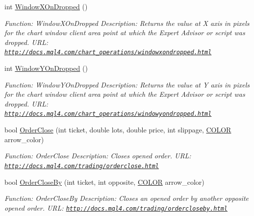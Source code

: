 \begin{DoxyCompactItemize}
int \hyperlink{class_m_q_l4_c_sharp_1_1_base_1_1_m_q_l_base_afe73f3f69b3a09805553509b930b3d4d}{Window\+X\+On\+Dropped} ()
\begin{DoxyCompactList}\small\item\em Function\+: Window\+X\+On\+Dropped Description\+: Returns the value at X axis in pixels for the chart window client area point at which the Expert Advisor or script was dropped. U\+RL\+: \href{http://docs.mql4.com/chart_operations/windowxondropped.html}{\tt http\+://docs.\+mql4.\+com/chart\+\_\+operations/windowxondropped.\+html} \end{DoxyCompactList}\item 
int \hyperlink{class_m_q_l4_c_sharp_1_1_base_1_1_m_q_l_base_a118d5dec92579d423c86b5f6b99323af}{Window\+Y\+On\+Dropped} ()
\begin{DoxyCompactList}\small\item\em Function\+: Window\+Y\+On\+Dropped Description\+: Returns the value at Y axis in pixels for the chart window client area point at which the Expert Advisor or script was dropped. U\+RL\+: \href{http://docs.mql4.com/chart_operations/windowyondropped.html}{\tt http\+://docs.\+mql4.\+com/chart\+\_\+operations/windowyondropped.\+html} \end{DoxyCompactList}\item 
bool \hyperlink{class_m_q_l4_c_sharp_1_1_base_1_1_m_q_l_base_a381198891e0f10ebf8322e0a35bf7f0f}{Order\+Close} (int ticket, double lots, double price, int slippage, \hyperlink{namespace_m_q_l4_c_sharp_1_1_base_1_1_enums_a79b99235c71c70f2f5207aac2ff24f1a}{C\+O\+L\+OR} arrow\+\_\+color)
\begin{DoxyCompactList}\small\item\em Function\+: Order\+Close Description\+: Closes opened order. U\+RL\+: \href{http://docs.mql4.com/trading/orderclose.html}{\tt http\+://docs.\+mql4.\+com/trading/orderclose.\+html} \end{DoxyCompactList}\item 
bool \hyperlink{class_m_q_l4_c_sharp_1_1_base_1_1_m_q_l_base_a95c9ede282a30a3183016ac7f917fe54}{Order\+Close\+By} (int ticket, int opposite, \hyperlink{namespace_m_q_l4_c_sharp_1_1_base_1_1_enums_a79b99235c71c70f2f5207aac2ff24f1a}{C\+O\+L\+OR} arrow\+\_\+color)
\begin{DoxyCompactList}\small\item\em Function\+: Order\+Close\+By Description\+: Closes an opened order by another opposite opened order. U\+RL\+: \href{http://docs.mql4.com/trading/ordercloseby.html}{\tt http\+://docs.\+mql4.\+com/trading/ordercloseby.\+html} \end{DoxyCompactList}\item 

\end{DoxyCompactItemize}
